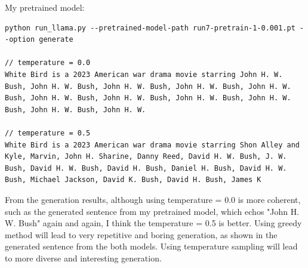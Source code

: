 \documentclass[11pt,a4paper]{article}
\begin{document}
My pretrained model:
\begin{lstlisting}
python run_llama.py --pretrained-model-path run7-pretrain-1-0.001.pt --option generate

// temperature = 0.0
White Bird is a 2023 American war drama movie starring John H. W. Bush, John H. W. Bush, John H. W. Bush, John H. W. Bush, John H. W. Bush, John H. W. Bush, John H. W. Bush, John H. W. Bush, John H. W. Bush, John H. W. Bush, John H. W.

// temperature = 0.5
White Bird is a 2023 American war drama movie starring Shon Alley and Kyle, Marvin, John H. Sharine, Danny Reed, David H. W. Bush, J. W. Bush, David H. W. Bush, David H. Bush, Daniel H. Bush, David H. W. Bush, Michael Jackson, David K. Bush, David H. Bush, James K
\end{lstlisting}


From the generation results, although using temperature = 0.0 is more coherent, such as the generated sentence from my pretrained model, which echos "John H. W. Bush" again and again, I think the temperature = 0.5 is better. Using greedy method will lead to very repetitive and boring generation, as shown in the generated sentence from the both models. Using temperature sampling will lead to more diverse and interesting generation.
\end{document}
